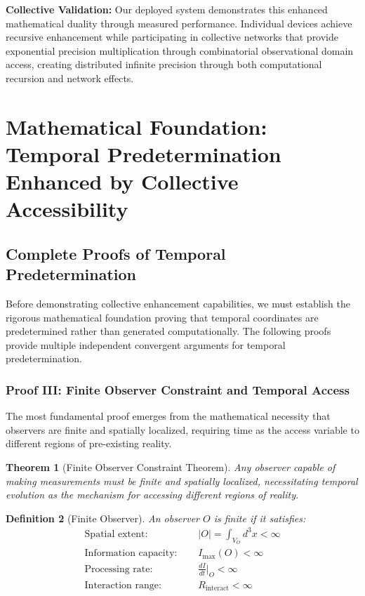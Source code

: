 \documentclass[12pt,a4paper]{article}
\newtheorem{theorem}{Theorem}[section]
\newtheorem{definition}[theorem]{Definition}
\begin{document}
\textbf{Collective Validation:} Our deployed system demonstrates this enhanced mathematical duality through measured performance. Individual devices achieve recursive enhancement while participating in collective networks that provide exponential precision multiplication through combinatorial observational domain access, creating distributed infinite precision through both computational recursion and network effects.

\section{Mathematical Foundation: Temporal Predetermination Enhanced by Collective Accessibility}

\subsection{Complete Proofs of Temporal Predetermination}

Before demonstrating collective enhancement capabilities, we must establish the rigorous mathematical foundation proving that temporal coordinates are predetermined rather than generated computationally. The following proofs provide multiple independent convergent arguments for temporal predetermination.

\subsubsection{Proof III: Finite Observer Constraint and Temporal Access}

The most fundamental proof emerges from the mathematical necessity that observers are finite and spatially localized, requiring time as the access variable to different regions of pre-existing reality.

\begin{theorem}[Finite Observer Constraint Theorem]
Any observer capable of making measurements must be finite and spatially localized, necessitating temporal evolution as the mechanism for accessing different regions of reality.
\end{theorem}

\begin{definition}[Finite Observer]
An observer $O$ is finite if it satisfies:
\begin{align}
\text{Spatial extent: } &\quad |O| = \int_{V_O} d^3x < \infty \\
\text{Information capacity: } &\quad I_{\max}(O) < \infty \\
\text{Processing rate: } &\quad \frac{dI}{dt}\Big|_O < \infty \\
\text{Interaction range: } &\quad R_{\text{interact}} < \infty
\end{align}
\end{definition}
\end{document}
